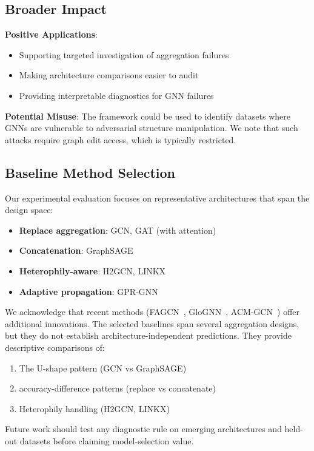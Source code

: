 \subsection{Broader Impact}

\textbf{Positive Applications}:
\begin{itemize}
    \item Supporting targeted investigation of aggregation failures
    \item Making architecture comparisons easier to audit
    \item Providing interpretable diagnostics for GNN failures
\end{itemize}

\textbf{Potential Misuse}: The framework could be used to identify datasets where GNNs are vulnerable to adversarial structure manipulation. We note that such attacks require graph edit access, which is typically restricted.

\subsection{Baseline Method Selection}

Our experimental evaluation focuses on representative architectures that span the design space:
\begin{itemize}
    \item \textbf{Replace aggregation}: GCN, GAT (with attention)
    \item \textbf{Concatenation}: GraphSAGE
    \item \textbf{Heterophily-aware}: H2GCN, LINKX
    \item \textbf{Adaptive propagation}: GPR-GNN
\end{itemize}

We acknowledge that recent methods (FAGCN~\cite{fagcn2021}, GloGNN~\cite{li2022glognn}, ACM-GCN~\cite{acmgcn2024}) offer additional innovations. The selected baselines span several aggregation designs, but they do not establish architecture-independent predictions. They provide descriptive comparisons of:
\begin{enumerate}
    \item The U-shape pattern (GCN vs GraphSAGE)
    \item accuracy-difference patterns (replace vs concatenate)
    \item Heterophily handling (H2GCN, LINKX)
\end{enumerate}

Future work should test any diagnostic rule on emerging architectures and held-out datasets before claiming model-selection value.

